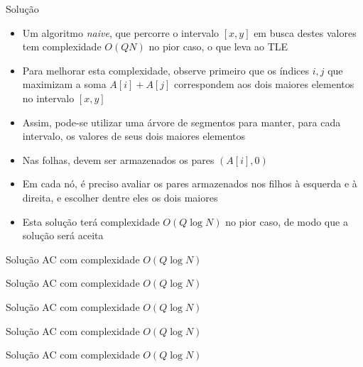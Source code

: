 \begin{frame}[fragile]{Solução}

    \begin{itemize}
        \item Um algoritmo \textit{naive}, que percorre o intervalo $[x, y]$ em busca destes
            valores tem complexidade $O(QN)$ no pior caso, o que leva ao TLE

        \item Para melhorar esta complexidade, observe primeiro que os índices $i, j$ que maximizam
            a soma $A[i] + A[j]$ correspondem aos dois maiores elementos no intervalo $[x, y]$

        \item Assim, pode-se utilizar uma árvore de segmentos para manter, para cada intervalo,
            os valores de seus dois maiores elementos

        \item Nas folhas, devem ser armazenados os pares $(A[i], 0)$

        \item Em cada nó, é preciso avaliar os pares armazenados nos filhos à esquerda e à direita,
            e escolher dentre eles os dois maiores

        \item Esta solução terá complexidade $O(Q\log N)$ no pior caso, de modo que a solução
            será aceita
    \end{itemize}

\end{frame}

\begin{frame}[fragile]{Solução AC com complexidade $O(Q\log N)$}
\end{frame}

\begin{frame}[fragile]{Solução AC com complexidade $O(Q\log N)$}
\end{frame}

\begin{frame}[fragile]{Solução AC com complexidade $O(Q\log N)$}
\end{frame}

\begin{frame}[fragile]{Solução AC com complexidade $O(Q\log N)$}
\end{frame}

\begin{frame}[fragile]{Solução AC com complexidade $O(Q\log N)$}
\end{frame}
